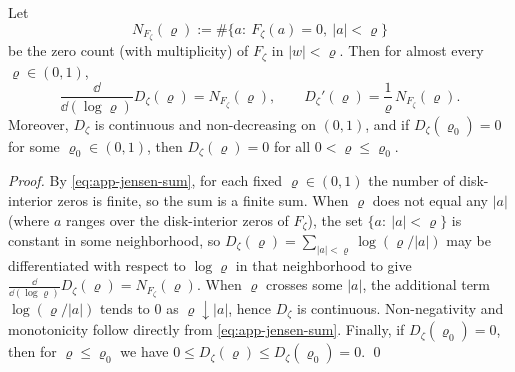 \begin{proposition}\label{prop:app-jensen-defect-log-derivative}
Let
\[
N_{F_{\zeta}}(\varrho)
:=\#\bigl\{a:\ F_{\zeta}(a)=0,\ |a|<\varrho\bigr\}
\]
be the zero count (with multiplicity) of \(F_{\zeta}\) in \(|w|<\varrho\).
Then for almost every \(\varrho\in(0,1)\),
\[
\frac{\dd}{\dd(\log\varrho)}D_{\zeta}(\varrho)=N_{F_{\zeta}}(\varrho),
\qquad
D_{\zeta}'(\varrho)=\frac{1}{\varrho}\,N_{F_{\zeta}}(\varrho).
\]
Moreover, \(D_{\zeta}\) is continuous and non-decreasing on \((0,1)\), and if \(D_{\zeta}(\varrho_0)=0\) for some \(\varrho_0\in(0,1)\), then \(D_{\zeta}(\varrho)=0\) for all \(0<\varrho\le \varrho_0\).
\end{proposition}
\begin{proof}
By \eqref{eq:app-jensen-sum}, for each fixed \(\varrho\in(0,1)\) the number of disk-interior zeros is finite, so the sum is a finite sum.
When \(\varrho\) does not equal any \(|a|\) (where \(a\) ranges over the disk-interior zeros of \(F_{\zeta}\)), the set \(\{a:\ |a|<\varrho\}\) is constant in some neighborhood, so
\(
D_{\zeta}(\varrho)=\sum_{|a|<\varrho}\log(\varrho/|a|)
\)
may be differentiated with respect to \(\log\varrho\) in that neighborhood to give \(\frac{\dd}{\dd(\log\varrho)}D_{\zeta}(\varrho)=N_{F_{\zeta}}(\varrho)\).
When \(\varrho\) crosses some \(|a|\), the additional term \(\log(\varrho/|a|)\) tends to \(0\) as \(\varrho\downarrow |a|\), hence \(D_{\zeta}\) is continuous.
Non-negativity and monotonicity follow directly from \eqref{eq:app-jensen-sum}.
Finally, if \(D_{\zeta}(\varrho_0)=0\), then for \(\varrho\le \varrho_0\) we have \(0\le D_{\zeta}(\varrho)\le D_{\zeta}(\varrho_0)=0\). \qed
\end{proof}

